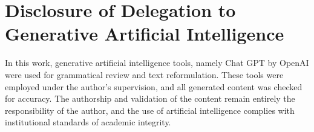 \chapter{Disclosure of Delegation to Generative Artificial Intelligence}


In this work, generative artificial intelligence tools, namely Chat GPT by OpenAI were used for grammatical review and text reformulation. These tools were employed under the author’s supervision, and all generated content was checked for accuracy. The authorship and validation of the content remain entirely the responsibility of the author, and the use of artificial intelligence complies with institutional standards of academic integrity.
